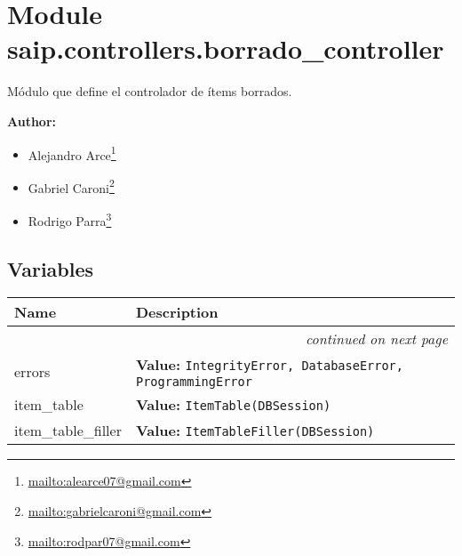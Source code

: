 %
%
%


\section{Module saip.controllers.borrado\_controller}

    \label{saip:controllers:borrado_controller}
Módulo que define el controlador de ítems borrados.

\textbf{Author:} \begin{itemize}
\setlength{\parskip}{0.6ex}
  \item Alejandro 
    Arce\footnote{\href{mailto:alearce07@gmail.com}{mailto:alearce07@gmail.com}}

  \item Gabriel 
    Caroni\footnote{\href{mailto:gabrielcaroni@gmail.com}{mailto:gabrielcaroni@gmail.com}}

  \item Rodrigo 
    Parra\footnote{\href{mailto:rodpar07@gmail.com}{mailto:rodpar07@gmail.com}}

\end{itemize}





  \subsection{Variables}

    \vspace{-1cm}
\hspace{\varindent}\begin{longtable}{|p{\varnamewidth}|p{\vardescrwidth}|l}
\cline{1-2}
\cline{1-2} \centering \textbf{Name} & \centering \textbf{Description}& \\
\cline{1-2}
\endhead\cline{1-2}\multicolumn{3}{r}{\small\textit{continued on next page}}\\\endfoot\cline{1-2}
\endlastfoot\raggedright e\-r\-r\-o\-r\-s\- & \raggedright \textbf{Value:} 
{\tt IntegrityError, DatabaseError, ProgrammingError}&\\
\cline{1-2}
\raggedright i\-t\-e\-m\-\_\-t\-a\-b\-l\-e\- & \raggedright \textbf{Value:} 
{\tt ItemTable(DBSession)}&\\
\cline{1-2}
\raggedright i\-t\-e\-m\-\_\-t\-a\-b\-l\-e\-\_\-f\-i\-l\-l\-e\-r\- & \raggedright \textbf{Value:} 
{\tt ItemTableFiller(DBSession)}&\\
\cline{1-2}
\end{longtable}


